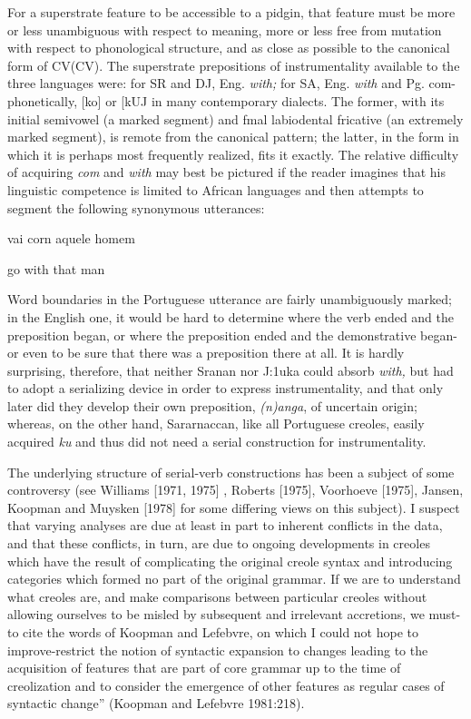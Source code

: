 For a superstrate feature to be accessible to a pidgin, that feature must be more or less unambiguous with respect to meaning, more or less free from mutation with respect to phonological structure, and as close as possible to the canonical form of CV(CV). The superstrate prepositions of instrumentality available to the three languages were: for SR and DJ, Eng. \textit{with;} for SA, Eng. \textit{with} and Pg. com-phonetically, [ko] or [kUJ in many contemporary dialects. The former, with its initial semivowel (a marked segment) and fmal labiodental fricative (an extremely marked segment), is remote from the canonical pattern; the latter, in the form in which it is perhaps most frequently realized, fits it exactly. The relative difficulty of acquiring \textit{com} and \textit{with} may best be pictured if the reader imagines that his linguistic competence
is limited to African languages and then attempts to segment the following synonymous utterances:

\ea\label{ex:234}
 vai corn aquele homem
\glt
\z

\ea\label{ex:235}
 go with that man
\glt
\z

Word boundaries in the Portuguese utterance are fairly un\-ambiguously marked; in the English one, it would be hard to determine where the verb ended and the preposition began, or where the preposi\-tion ended and the demonstrative began-or even to be sure that there was a preposition there at all. It is hardly surprising, therefore, that neither Sranan nor J:1uka could absorb \textit{with,} but had to adopt a serializ\-ing device in order to express instrumentality, and that only later did they develop their own preposition, \textit{(n)anga}, of uncertain origin;
whereas, on the other hand, Sararnaccan, like all Portuguese creoles, easily acquired \textit{ku} and thus did not need a serial construction for instrumentality.

The underlying structure of serial-verb constructions has been a subject of some controversy (see Williams [1971, 1975] , Roberts [1975], Voorhoeve [1975], Jansen, Koopman and Muysken [1978] for some differing views on this subject). I suspect that varying analyses are due at least in part to inherent conflicts in the data, and that these conflicts, in turn, are due to ongoing developments in creoles which have the result of complicating the original creole syntax and intro\-ducing categories which formed no part of the original grammar. If we are to understand what creoles are, and make comparisons between particular creoles without allowing ourselves to be misled by sub\-sequent and irrelevant accretions, we must-to cite the words of Koop\-man and Lefebvre, on which I could not hope to improve{}-{\textquotedbl}restrict the notion of syntactic expansion to changes leading to the acquisition of features that are part of core grammar up to the time of creolization and to consider the emergence of other features as regular cases of syntactic change'' (Koopman and Lefebvre 1981:218).


